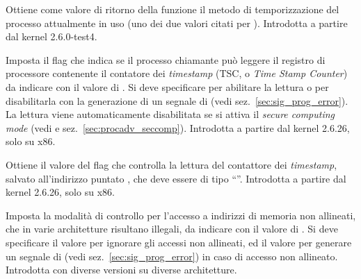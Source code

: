 \begin{basedescript}{\desclabelwidth{1.5cm}\desclabelstyle{\nextlinelabel}}
\item[\constd{PR\_GET\_TIMING}] Ottiene come valore di ritorno della funzione
  il metodo di temporizzazione del processo attualmente in uso (uno dei due
  valori citati per ). Introdotta a partire dal kernel
  2.6.0-test4.

\item[\constd{PR\_SET\_TSC}] Imposta il flag che indica se il processo
  chiamante può leggere il registro di processore contenente il contatore dei
  \textit{timestamp} (TSC, o \textit{Time Stamp Counter}) da indicare con il
  valore di . Si deve specificare  per
  abilitare la lettura o  per disabilitarla con la
  generazione di un segnale di  (vedi
  sez.~\ref{sec:sig_prog_error}). La lettura viene automaticamente
  disabilitata se si attiva il \textit{secure computing mode} (vedi
   e sez.~\ref{sec:procadv_seccomp}).  Introdotta a
  partire dal kernel 2.6.26, solo su x86.

\item[\constd{PR\_GET\_TSC}] Ottiene il valore del flag che controlla la
  lettura del contattore dei \textit{timestamp}, salvato all'indirizzo
  puntato , che deve essere di tipo ``''. Introdotta a
  partire dal kernel 2.6.26, solo su x86.

\item[\constd{PR\_SET\_UNALIGN}] Imposta la modalità di controllo per l'accesso
  a indirizzi di memoria non allineati, che in varie architetture risultano
  illegali, da indicare con il valore di . Si deve specificare il
  valore  per ignorare gli accessi non allineati,
  ed il valore  per generare un segnale di
   (vedi sez.~\ref{sec:sig_prog_error}) in caso di accesso non
  allineato.  Introdotta con diverse versioni su diverse architetture.


\end{basedescript}
